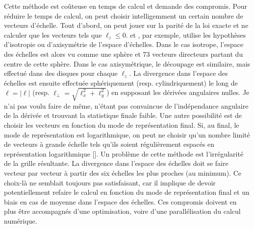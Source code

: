 Cette méthode est coûteuse en temps de calcul et demande des compromis. Pour réduire le temps de calcul, on peut choisir intelligemment un certain nombre de vecteurs d'échelle. Tout d'abord, on peut jouer sur la parité de la loi exacte et ne calculer que les vecteurs tels que $\ell_z \leq 0$.  \cite{ferrand_fluid_2021} et \cite{ferrand_-depth_2022}, par exemple, utilise les hypothèses d'isotropie ou d'axisymétrie de l'espace d'échelles. Dans le cas isotrope,  l'espace des échelles est alors vu comme une sphère et 73 vecteurs directeurs partant du centre de cette sphère. Dans le cas axisymétrique, le découpage est similaire, mais effectué dans des disques pour chaque $\ell_z$. La divergence dans l'espace des échelles est ensuite effectuée sphériquement (resp. cylindriquement) le long de $\ell = |\boldsymbol{\ell}|$ (resp. $\ell_{\perp} = \sqrt{\ell^2_x + \ell^2_y}$) en supposant les dérivées angulaires nulles. Je n'ai pas voulu faire de même, n'étant pas convaincue de l'indépendance angulaire de la dérivée et trouvant la statistique finale faible. Une autre possibilité est de choisir les vecteurs en fonction du mode de représentation final. Si, au final, le mode de représentation est logarithmique, on peut ne choisir qu'un nombre limité de vecteurs à grande échelle tels qu'ils soient régulièrement espacés en représentation logarithmique [\cite{manzini_local_2022}]. Un problème de cette méthode est l'irrégularité de la grille résultante. La divergence dans l'espace des échelles doit se faire vecteur par vecteur à partir des six échelles les plus proches (au minimum).  Ce choix-là ne semblait toujours pas satisfaisant, car il implique de devoir potentiellement refaire le calcul en fonction du mode de représentation final et un biais en cas de moyenne dans l'espace des échelles. Ces compromis doivent en plus être accompagnés d'une optimisation, voire d'une parallélisation du calcul numérique. 

